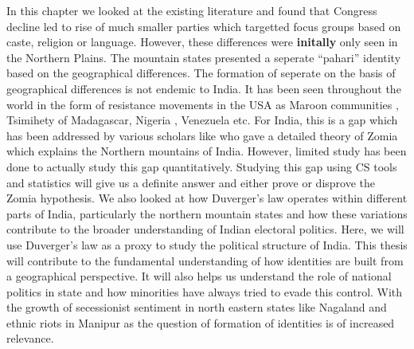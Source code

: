  In this chapter we looked at the existing literature and found that Congress decline led to rise of much smaller parties which targetted focus groups based on caste, religion or language. However, these differences were \textbf{initally} only seen in the Northern Plains. The mountain states presented a seperate ``pahari'' identity based on the geographical differences. The formation of seperate on the basis of geographical differences is not endemic to India. It has been seen throughout the world in the form of resistance movements in the USA as Maroon communities \citep{price2020rainforest}, Tsimihety of Madagascar, Nigeria , Venezuela etc. For India, this is a gap which has been addressed by various scholars like \cite{scott2005civilizations} who gave a detailed theory of Zomia which explains the Northern mountains of India. However, limited study has been done to actually study this gap quantitatively. Studying this gap using CS tools and statistics will give us a definite answer and either prove or disprove the Zomia hypothesis. We also looked at how Duverger's law operates within different parts of India, particularly the northern mountain states and how these variations contribute to the broader understanding of Indian electoral politics. Here, we will use Duverger's law as a proxy to study the political structure of India. This thesis will contribute to the fundamental understanding of how identities are built from a geographical perspective. It will also helps us understand the role of national politics in state and how minorities have always tried to evade this control. With the growth of secessionist sentiment in north eastern states like Nagaland and ethnic riots in Manipur as the question of formation of identities is of increased relevance.